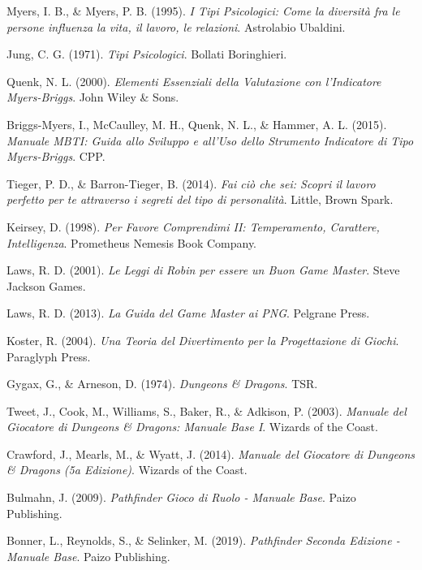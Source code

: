 Myers, I. B., \& Myers, P. B. (1995). 
\textit{I Tipi Psicologici: Come la diversità fra le persone influenza la vita, il lavoro, le relazioni}. 
Astrolabio Ubaldini.

Jung, C. G. (1971). 
\textit{Tipi Psicologici}. 
Bollati Boringhieri.

Quenk, N. L. (2000). 
\textit{Elementi Essenziali della Valutazione con l'Indicatore Myers-Briggs}. 
John Wiley \& Sons.

Briggs-Myers, I., McCaulley, M. H., Quenk, N. L., \& Hammer, A. L. (2015). 
\textit{Manuale MBTI: Guida allo Sviluppo e all'Uso dello Strumento Indicatore di Tipo Myers-Briggs}. 
CPP.

Tieger, P. D., \& Barron-Tieger, B. (2014). 
\textit{Fai ciò che sei: Scopri il lavoro perfetto per te attraverso i segreti del tipo di personalità}. 
Little, Brown Spark.

Keirsey, D. (1998). 
\textit{Per Favore Comprendimi II: Temperamento, Carattere, Intelligenza}. 
Prometheus Nemesis Book Company.

Laws, R. D. (2001). 
\textit{Le Leggi di Robin per essere un Buon Game Master}. 
Steve Jackson Games.

Laws, R. D. (2013). 
\textit{La Guida del Game Master ai PNG}. 
Pelgrane Press.

Koster, R. (2004). 
\textit{Una Teoria del Divertimento per la Progettazione di Giochi}. 
Paraglyph Press.

Gygax, G., \& Arneson, D. (1974).
\textit{Dungeons \& Dragons}.
TSR.

Tweet, J., Cook, M., Williams, S., Baker, R., \& Adkison, P. (2003).
\textit{Manuale del Giocatore di Dungeons \& Dragons: Manuale Base I}.
Wizards of the Coast.

Crawford, J., Mearls, M., \& Wyatt, J. (2014).
\textit{Manuale del Giocatore di Dungeons \& Dragons (5a Edizione)}.
Wizards of the Coast.

Bulmahn, J. (2009).
\textit{Pathfinder Gioco di Ruolo - Manuale Base}.
Paizo Publishing.

Bonner, L., Reynolds, S., \& Selinker, M. (2019).
\textit{Pathfinder Seconda Edizione - Manuale Base}.
Paizo Publishing.

